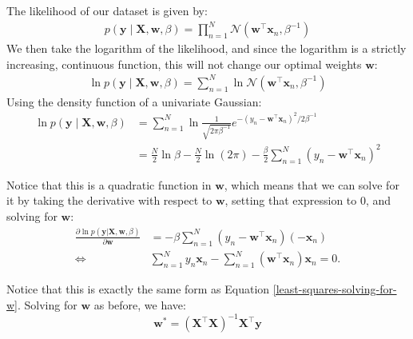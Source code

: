 \begin{derivation}
    The likelihood of our dataset is given by:
    \begin{align*}
        p(\mathbf{y} \mid \mathbf{X}, \mathbf{w}, \beta) = \prod_{n=1}^{N} \mathcal{N}(\mathbf{w}^\top\mathbf{x}_n, \beta^{-1})
    \end{align*}
    We then take the logarithm of the likelihood, and since the logarithm is a strictly increasing, continuous function, this will not change our optimal weights $\mathbf{w}$:
    \begin{align*}
        \ln{p(\mathbf{y} \mid \mathbf{X}, \mathbf{w}, \beta)} = \sum_{n=1}^{N} \ln{\mathcal{N}(\mathbf{w}^\top\mathbf{x}_n, \beta^{-1})}
    \end{align*}
    Using the density function of a univariate Gaussian:
    \begin{align*}
        \ln{p(\mathbf{y} \mid \mathbf{X}, \mathbf{w}, \beta)} &= \sum_{n=1}^{N} \ln{\frac{1}{\sqrt{2\pi\beta^{-1}}} e^{-(y_n - \mathbf{w}^\top\mathbf{x}_n)^2 / 2\beta^{-1}}} \\
        &= \frac{N}{2}\ln{\beta} - \frac{N}{2}\ln{(2\pi)} - \frac{\beta}{2} \sum_{n=1}^{N} (y_n - \mathbf{w}^\top\mathbf{x}_n)^2
    \end{align*}

    Notice that this is a quadratic function in $\mathbf{w}$, which means that we can solve for it by taking the derivative with respect to $\mathbf{w}$, setting that expression to 0, and solving for $\mathbf{w}$:
    \begin{align*}
      \frac{\partial \ln{p(\mathbf{y} | \mathbf{X}, \mathbf{w}, \beta)}}{\partial \mathbf{w}} & = -  \beta \sum_{n=1}^{N} (y_n - \mathbf{w}^\top\mathbf{x}_n)(-\mathbf{x}_n)
      \\
      \Leftrightarrow \quad & 
      \sum_{n=1}^{N} y_n \mathbf{x}_n - \sum_{n=1}^N (\mathbf{w}^\top\mathbf{x}_n)\mathbf{x}_n=0.
    \end{align*}

    Notice that this is exactly the same form as Equation \ref{least-squares-solving-for-w}. Solving for $\mathbf{w}$ as before, we have:
    \begin{equation}
        \label{eq:mle-solved-for-w}
        \mathbf{w}^* = (\mathbf{X}^\top\mathbf{X})^{-1}\mathbf{X}^\top\mathbf{y}
    \end{equation}
\end{derivation}

